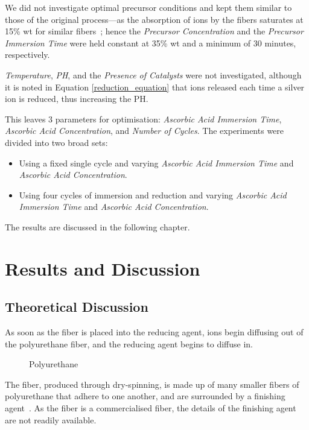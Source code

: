 \documentclass[a4paper, oneside]{discothesis}
\begin{document}
We did not investigate optimal precursor conditions and kept them similar to those of the original process---as the absorption of  ions by the fibers saturates at 15\% wt for similar fibers~\cite{cond_shell}; hence the \textit{Precursor Concentration} and the \textit{Precursor Immersion Time} were held constant at 35\% wt and a minimum of 30 minutes, respectively.

\textit{Temperature}, \textit{PH}, and the \textit{Presence of Catalysts} were not investigated, although it is noted in Equation \ref{reduction_equation} that  ions released each time a silver ion is reduced, thus increasing the PH.

This leaves 3 parameters for optimisation: \textit{Ascorbic Acid Immersion Time}, \textit{Ascorbic Acid Concentration}, and \textit{Number of Cycles}.
The experiments were divided into two broad sets:
\begin{itemize}
    \item Using a fixed single cycle and varying \textit{Ascorbic Acid Immersion Time} and \textit{Ascorbic Acid Concentration}.
    \item Using four cycles of immersion and reduction and varying \textit{Ascorbic Acid Immersion Time} and \textit{Ascorbic Acid Concentration}.
\end{itemize}

The results are discussed in the following chapter.


\chapter{Results and Discussion}

\section{Theoretical Discussion}
As soon as the fiber is placed into the reducing agent,  ions begin diffusing out of the polyurethane fiber, and the reducing agent begins to diffuse in.
\begin{figure}[ht]
    \centering
    {} 
    \caption{Polyurethane}
    \label{fig:polyurethane}
\end{figure}{}

The fiber, produced through dry-spinning, is made up of many smaller fibers of polyurethane that adhere to one another, and are surrounded by a finishing agent~\cite{spandex_finish}. As the fiber is a commercialised fiber, the details of the finishing agent are not readily available.
\end{document}
